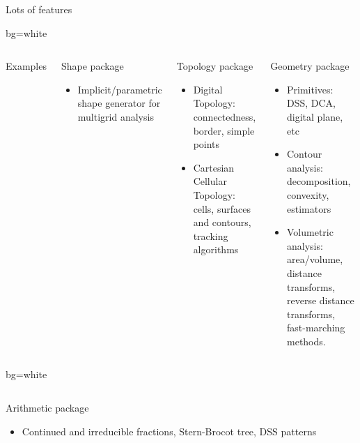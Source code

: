 \documentclass[noamsthm, pdftex, french]{beamer}
\begin{document}
\begin{frame}
\begin{columns}
\begin{alertblock}{\centering Lots of features}
\begin{beamercolorbox}{bg=white}
\begin{columns}[onlytextwidth]
\begin{exampleblock}{Examples}
          \end{exampleblock}
          

          \begin{block}{Shape package}
          \begin{itemize}
          \item Implicit/parametric shape generator for multigrid analysis
          \end{itemize}
        \end{block}
        
        \begin{block}{Topology package}
          \begin{itemize}
            \item Digital Topology: connectedness, border, simple points
            \item Cartesian Cellular Topology: cells, surfaces and contours, tracking algorithms
          \end{itemize}
        \end{block}
        
        \begin{block}{Geometry package}
          \begin{itemize}
          \item Primitives: DSS, DCA, digital plane, etc
          \item Contour analysis: decomposition, convexity, estimators
          \item Volumetric analysis: area/volume, distance transforms, reverse distance transforms, fast-marching methods.
          \end{itemize}
        \end{block}
        
        \end{columns}

      \end{beamercolorbox}
      

      \begin{beamercolorbox}{bg=white}
        \begin{columns}[onlytextwidth]
          \begin{block}{Arithmetic package}
          \begin{itemize}
            \item Continued and irreducible fractions, Stern-Brocot tree, DSS patterns
          \end{itemize}
        \end{block}
        

\end{columns}
\end{beamercolorbox}
\end{alertblock}
\end{columns}
\end{frame}
\end{document}
